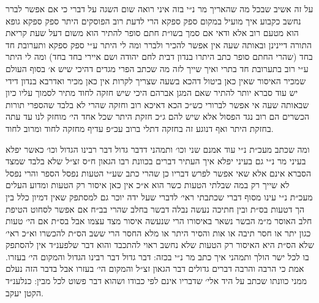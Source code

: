 \documentclass[12pt, openany]{book}
\begin{document}
\begin{multicols}{2}
על זה אשיב שבכל מה שהאריך מר נ״י בזה איני רואה שום השגה על דברי כי אם אפשר לברר נחשב כקבוע איך מועיל במקום ספק ספקא הרי לדעת רוב הפוסקים היתר ספק ספקא גופא הוא מטעם רוב אלא ודאי אם סמך בשו״ת חתם סופר להתיר הוא משום דעל שעת קריאת התורה דיינינן ובאותה שעה אין אפשר להכיר ולברר ומה לי היתר ע״י ספק ספקא ותערובת חד בחד (שהרי החתם סופר כתב היתרו בנדון דבית לחם יהודה ושם איירי בחד בחד) ומה לי היתר ע״י רוב בתערובת חד בתרי ואיך שייך לזה מה שכתב הפרי מגדים דהיכי שיש א׳ בסוף העולם שמכיר האיסור שאין כאן ביטול דהכא בשעה שצריך לקרות אין כאן מכיר ואדרבא בנדון דידי יש עוד סברא יותר להתיר שאם המגן אברהם היכי שיש חזקה לחוד מתיר לסמוך עליו כיון שבאותה שעה אי אפשר לברורי כש״כ הכא דאיכא רוב וחזקה שהרי לא בלבד שהספרי תורות הכשרים הם רוב נגד הפסול אלא שיש להם ג״כ חזקת היתר שכל אחד הי׳ מוחזק לנו עד עתה בחזקת היתר ואף דנוגע זה בחזקה דתלי ברוב עכ״פ עדיף מחזקה לחוד ומרוב לחוד.\\\vspace{0pt}

ומה שכתב מעכ״ת נ״י עוד אמנם שני וכו׳ ותמהני דדבר גדול דבר רבינו הגדול וכו׳ כאשר יפלא בעיני מר נ״י גם בעיני יפלא איך העתיר דברים בכוונת רבו הגאון ח״ס זצ״ל שלא בלבד שמצד הסברא אינם אלא שאי אפשר לפרש דבריו כן שהרי כתב שע״י הטעות נפסל הספר והרי נפסל לא שייך רק במה שבלתי הטעות כשר הוא א״כ אין כאן איסור רק הטעות ומדוע העלים מעכ״ת נ״י עינו מסוף דברי שכתבתי ראי׳ לדברי שעל ידה יוכר גם למסתפק שאין דמיון כלל בין הך דטעות בס״ת ובין חתיכה נעשה נבלה דבשר בחלב שהרי בב״ח אם אפשר לסחוט הטיפת חלב האוסר מ״מ הבשר נשאר באיסורו הרי שנעשה איסור מצד עצמו אבל בס״ת אם הי׳ טעות כגון יתר או חסר תיבה או אות והסיר היתר או מלא החסר הרי ששב הס״ת להכשרו וא״כ ראי׳ שלא הס״ת היא האיסור רק הטעות שלא נחשב ראוי להתכבד והוא דבר שלפענ״ד אין להסתפק בו לכל ישר הולך ותמהני איך כתב מר נ״י בכזה: דבר גדול דבר רבינו הגדול והמקום הי׳ בעזרו. אמת כי הרבה והרבה דברים גדולים דבר הגאון זצ״ל והמקום הי׳ בעזרו אבל בדבר הזה נעלם ממני כוונתו שכתב על היד אלי׳ שדבריו אינם לפי כבודו ושהוא דבר פשוט לכל מבין: כנלענ״ד הקטן יעקב.\\\vspace{0pt}

\end{multicols}\newpage
\end{document}
